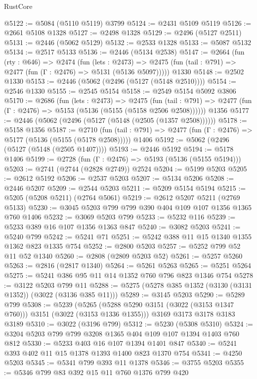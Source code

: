 \begin{lexlean}{RustCore}
\begin{coremodule}
@5122 := @5084 (@5110 @5119) @3799
@5124 := @2431 @5109 @5119
@5126 := @2661 @5108 @1328
@5127 := @2498 @1328
@5129 := @2496 (@5127 @2511)
@5131 := @2446 (@5062 @5129)
@5132 := @2533 @1328
@5133 := @5087 @5132
@5134 := @2517 @5133
@5136 := @2446 (@5134 @2538)
@5147 := @2664
    (fun (rty : @646) =>
    @2474
      (fun (lets : @2473) =>
      @2475 (fun (tail : @791) => @2477 (fun (Γ : @2476) => @5131 (@5136 @5097)))))
    @1330
@5148 := @2502 @1330
@5153 := @2446 (@5062 (@2496 (@5127 (@5148 @2510))))
@5154 := @2546 @1330
@5155 := @2545 @5154
@5158 := @2549 @5154 @5092 @3806
@5170 := @2686
    (fun (lets : @2473) =>
    @2475
      (fun (tail : @791) => @2477 (fun (Γ : @2476) => @5153 (@5136 (@5155 (@5158 @2506 @2508))))))
    @1356
@5177 := @2446 (@5062 (@2496 (@5127 (@5148 (@2505 (@1357 @2508))))))
@5178 := @5158 @1356
@5187 := @2710
    (fun (tail : @791) => @2477 (fun (Γ : @2476) => @5177 (@5136 (@5155 (@5178 @2508)))))
    @1406
@5192 := @5062 (@2496 (@5127 (@5148 (@2505 @1407))))
@5193 := @2446 @5192
@5194 := @5178 @1406
@5199 := @2728 (fun (Γ : @2476) => @5193 (@5136 (@5155 @5194)))
@5203 := @2741 (@2744 (@2828 @2749)) @2524
@5204 := @5199 @5203
@5205 := @2612 @5192
@5206 := @2537 @5203
@5207 := @5134 @5206
@5208 := @2446 @5207
@5209 := @2544 @5203
@5211 := @5209 @5154 @5194
@5215 := @5205 (@5208 @5211) (@2764 @5061)
@5219 := @2612 @5207 @5211 (@2769 @5133)
@5230 := @3045 @5203 @799 @799 @390 @404 @109 @107 @1356 @1365 @760 @1406
@5232 := @3069 @5203 @799
@5233 := @5232 @116
@5239 := @5233 @389 @16 @107 @1356 @1363 @847
@5240 := @3082 @5203
@5241 := @5240 @799
@5242 := @5241 @71
@5251 := @5242 @388 @11 @15 @1340 @1355 @1362 @823 @1335 @754
@5252 := @2800 @5203
@5257 := @5252 @799 @52 @11 @52 @1340
@5260 := @2808 (@2809 @5203 @52)
@5261 := @5257 @5260
@5263 := @2816 (@2817 @1340)
@5264 := @5261 @5263
@5265 := @5251 @5264
@5275 := @5241 @386 @95 @11 @14 @1352 @760 @796 @823 @1346 @754
@5278 := @3122 @5203 @799 @11
@5288 := @5275 (@5278 @385 @1352 (@3130 (@3131 @1352)) (@3022 (@3136 @385 @11)))
@5289 := @3145 @5203
@5290 := @5289 @799
@5308 := @5239
    (@5265 (@5288 @5290 @3151 (@3022 (@3153 @1347 @760))) @3151 (@3022 (@3153 @1336 @1355)))
    @3169
    @3173
    @3178
    @3183
    @3189
@5310 := @3022 (@3196 @799)
@5312 := @5230 (@5308 @5310)
@5324 := @3204 @5203 @799 @799 @3208 @1365 @404 @109 @107 @1394 @1403 @760 @812
@5330 := @5233 @403 @16 @107 @1394 @1401 @847
@5340 := @5241 @393 @402 @11 @15 @1378 @1393 @1400 @823 @1370 @754
@5341 := @4250 @5203
@5345 := @5341 @799 @393 @11 @1378
@5346 := @3755 @5203
@5355 := @5346 @799 @83 @392 @15 @11 @760 @1376 @799 @420

\end{coremodule}
\end{lexlean}
